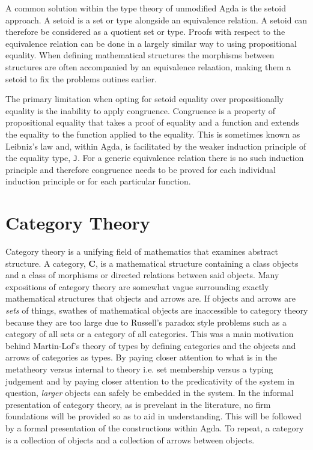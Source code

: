 A common solution within the type theory of unmodified Agda is the setoid
approach. A setoid is a set or type alongside an equivalence relation.  A setoid
can therefore be considered as a quotient set or type. Proofs with respect to
the equivalence relation can be done in a largely similar way to using
propositional equality. When defining mathematical structures the morphisms
between structures are often accompanied by an equivalence relaation, making
them a setoid to fix the problems outines earlier.


The primary limitation when opting for setoid equality over propositionally
equality is the inability to apply congruence. Congruence is a property of
propositional equality that takes a proof of equality and a function and extends
the equality to the function applied to the equality. This is sometimes
known as Leibniz's law and, within Agda, is facilitated by the weaker induction
principle of the equality type, \verb|J|. For a generic equivalence relation
there is no such induction principle and therefore congruence needs to be proved
for each individual induction principle or for each particular function.

\section{Category Theory}

Category theory is a unifying field of mathematics that examines abstract
structure. A category, \textbf{C}, is a mathematical structure containing a
class objects and a class of morphisms or directed relations between said
objects. Many expositions of category theory are somewhat vague surrounding
exactly mathematical structures that objects and arrows are. If objects and
arrows are \textit{sets} of things, swathes of mathematical objects are
inaccessible to category theory because they are too large due to Russell's
paradox style problems such as a category of all sets or a category of all
categories. This was a main motivation behind Martin-Lof's theory of types by
defining categories and the objects and arrows of categories as types. By paying
closer attention to what is in the metatheory versus internal to theory i.e. set
membership versus a typing judgement and by paying closer attention to the
predicativity of the system in question, \textit{larger} objects can safely be
embedded in the system. In the informal presentation of
category theory, as is prevelant in the literature, no firm foundations will be
provided so as to aid in understanding. This will be followed by a formal
presentation of the constructions within Agda. To repeat, a category is a
collection of objects and a collection of arrows between objects.

